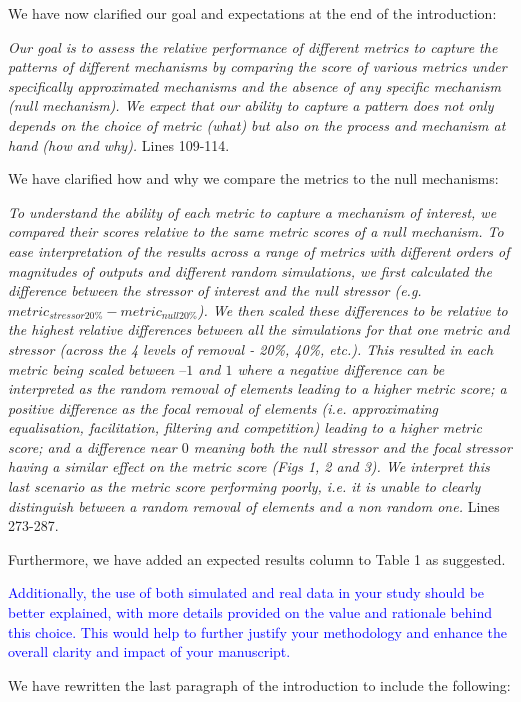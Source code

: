 \documentclass[
]{article}
\begin{document}
We have now clarified our goal and expectations at the end of the introduction:

\textit{Our goal is to assess the relative performance of different metrics to capture the patterns of different mechanisms by comparing the score of various metrics under specifically approximated mechanisms and the absence of any specific mechanism (null mechanism).
We expect that our ability to capture a pattern does not only depends on the choice of metric (what) but also on the process and mechanism at hand (how and why).}
Lines 109-114.

We have clarified how and why we compare the metrics to the null mechanisms:

\textit{To understand the ability of each metric to capture a mechanism of interest, we compared their scores relative to the same metric scores of a null mechanism.
To ease interpretation of the results across a range of metrics with different orders of magnitudes of outputs and different random simulations, we first calculated the difference between the stressor of interest and the null stressor (e.g. $metric_{stressor20\%} - metric_{null20\%}$).
We then scaled these differences to be relative to the highest relative differences between all the simulations for that one metric and stressor (across the 4 levels of removal - 20\%, 40\%, etc.).
This resulted in each metric being scaled between $–1$ and $1$ where a negative difference can be interpreted as the random removal of elements leading to a higher metric score; a positive difference as the focal removal of elements (i.e. approximating equalisation, facilitation, filtering and competition) leading to a higher metric score; and a difference near $0$ meaning both the null stressor and the focal stressor having a similar effect on the metric score (Figs 1, 2 and 3).
We interpret this last scenario as the metric score performing poorly, i.e. it is unable to clearly distinguish between a random removal of elements and a non random one.}
Lines 273-287.

Furthermore, we have added an expected results column to Table 1 as suggested.

\textcolor{blue}{Additionally, the use of both simulated and real data in your study should be better explained, with more details provided on the value and rationale behind this choice.
This would help to further justify your methodology and enhance the overall clarity and impact of your manuscript.}

We have rewritten the last paragraph of the introduction to include the following:
\end{document}
